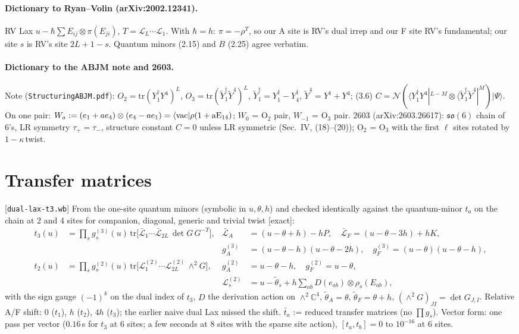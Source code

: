 \documentclass[11pt]{article}
\newcommand{\tb}{\bar t}
\newcommand{\Lb}{\bar{\mathcal L}}
\newcommand{\cL}{\mathcal L}
\newcommand{\nb}[1]{\texttt{#1}}
\newcommand{\ex}{\textsf{[exact]}}
\newcommand{\ket}[1]{|#1\rangle}
\newcommand{\bra}[1]{\langle#1|}
\begin{document}
\paragraph{Dictionary to Ryan--Volin (arXiv:2002.12341).} RV Lax $u-\hbar\sum E_{ij}\otimes\pi(E_{ji})$, $T=\cL_L\cdots\cL_1$.
With $\hbar=h$: $\pi=-\rho^T$, so our A site is RV's dual irrep and our F site RV's fundamental; our site $s$ is RV's site
$2L+1-s$. Quantum minors (2.15) and $B$ (2.25) agree verbatim.

\paragraph{Dictionary to the ABJM note and 2603.} Note (\nb{StructuringABJM.pdf}): $O_2=\mathrm{tr}(Y_1^\dagger Y^4)^L$,
$O_3=\mathrm{tr}(\tilde Y_1^\dagger\tilde Y^4)^L$, $\tilde Y_1^\dagger=Y_1^\dagger-Y_4^\dagger$, $\tilde Y^4=Y^1+Y^4$; (3.6)
$C=\mathcal N(\bra{Y_1^\dagger Y^4}^{L-M}\otimes\bra{\tilde Y_1^\dagger\tilde Y^4}^{M})\ket\Psi$. On one pair:
$W_a:=(e_1+ae_4)\otimes(e_4-ae_1)=\bra{\rm vac}\rho(1+aE_{14})$; $W_0$ = O$_2$ pair, $W_{-1}$ = O$_3$ pair. 2603
(arXiv:2603.26617): $\mathfrak{so}(6)$ chain of 6's, LR symmetry $\tau_+=\tau_-$, structure constant $C=0$ unless LR
symmetric (Sec.~IV, (18)--(20)); O$_2$ = O$_3$ with the first $\ell$ sites rotated by $1-\kappa\,$twist.

\section{Transfer matrices}\label{sec:tm}

[\nb{dual-lax-t3.wb}] From the one-site quantum minors (symbolic in $u,\theta,h$) and checked identically against the
quantum-minor $t_a$ on the chain at 2 and 4 sites for companion, diagonal, generic and trivial twist \ex:
\begin{align}
 t_3(u)&=\prod_sg^{(3)}_s(u)\,\mathrm{tr}\big[\Lb_1\cdots\Lb_{2L}\,\det G\,G^{-T}\big],&
 \Lb_A&=(u-\theta+h)-hP,\quad \Lb_F=(u-\theta-3h)+hK,\nonumber\\
 &&g^{(3)}_A&=(u-\theta-h)(u-\theta-2h),\quad g^{(3)}_F=(u-\theta)(u-\theta-h),\\
 t_2(u)&=\prod_sg^{(2)}_s(u)\,\mathrm{tr}\big[\cL^{(2)}_1\cdots\cL^{(2)}_{2L}\,\wedge^2G\big],&
 g^{(2)}_A&=u-\theta-h,\quad g^{(2)}_F=u-\theta,\nonumber\\
 &&\cL^{(2)}_s&=u-\tilde\theta_s+h\textstyle\sum_{ab}D(e_{ab})\otimes\rho_s(E_{ab}),
\end{align}
with the sign gauge $(-1)^k$ on the dual index of $t_3$, $D$ the derivation action on $\wedge^2\mathbb C^4$,
$\tilde\theta_A=\theta$, $\tilde\theta_F=\theta+h$, $(\wedge^2G)_{JI}=\det G_{J,I}$. Relative A/F shift: $0$ ($t_1$), $h$ ($t_2$),
$4h$ ($t_3$); the earlier naive dual Lax missed the shift. $\tb_a$ := reduced transfer matrices (no $\prod g_s$).
Vector form: one pass per vector ($0.16$\,s for $t_3$ at 6 sites; a few seconds at 8 sites with the sparse site action),
$[t_a,t_b]=0$ to $10^{-16}$ at 6 sites.
\end{document}
